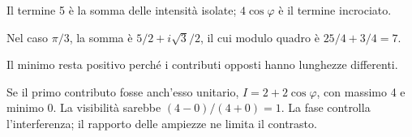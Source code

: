 


Il termine 5 è la somma delle intensità isolate; \(4\cos\varphi\) è il termine incrociato.


Nel caso \(\pi/3\), la somma è \(5/2+i\sqrt3/2\), il cui modulo quadro è \(25/4+3/4=7\).


Il minimo resta positivo perché i contributi opposti hanno lunghezze differenti.


Se il primo contributo fosse anch'esso unitario, \(I=2+2\cos\varphi\), con massimo 4 e minimo 0. La visibilità sarebbe \((4-0)/(4+0)=1\). La fase controlla l’interferenza; il rapporto delle ampiezze ne limita il contrasto.

